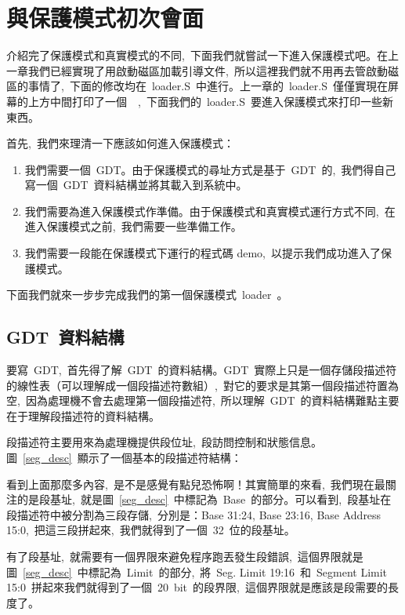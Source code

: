 \section{與保護模式初次會面}

介紹完了保護模式和真實模式的不同,~下面我們就嘗試一下進入保護模式吧。在上一章我們已經實現了用啟動磁區加載引導文件,~所以這裡我們就不用再去管啟動磁區的事情了,~下面的修改均在~loader.S~中進行。上一章的~loader.S~僅僅實現在屏幕的上方中間打印了一個~~,~下面我們的~loader.S~要進入保護模式來打印一些新東西。

首先,~我們來理清一下應該如何進入保護模式：

\begin{enumerate}
  \item 我們需要一個~GDT。由于保護模式的尋址方式是基于~GDT~的,~我們得自己寫一個~GDT~資料結構並將其載入到系統中。
  \item 我們需要為進入保護模式作準備。由于保護模式和真實模式運行方式不同,~在進入保護模式之前,~我們需要一些準備工作。
  \item 我們需要一段能在保護模式下運行的程式碼 demo,~以提示我們成功進入了保護模式。
\end{enumerate}

下面我們就來一步步完成我們的第一個保護模式~loader~。

\subsection{GDT~資料結構}

要寫~GDT,~首先得了解~GDT~的資料結構。GDT~實際上只是一個存儲段描述符的線性表（可以理解成一個段描述符數組）,~對它的要求是其第一個段描述符置為空,~因為處理機不會去處理第一個段描述符,~所以理解~GDT~的資料結構難點主要在于理解段描述符的資料結構。

段描述符主要用來為處理機提供段位址,~段訪問控制和狀態信息。圖~\ref{seg_desc}~顯示了一個基本的段描述符結構：


看到上面那麼多內容,~是不是感覺有點兒恐怖啊！其實簡單的來看,~我們現在最關注的是段基址,~就是圖~\ref{seg_desc}~中標記為~Base~的部分。可以看到,~段基址在段描述符中被分割為三段存儲,~分別是：Base 31:24, Base 23:16, Base Address 15:0,~把這三段拼起來,~我們就得到了一個~32~位的段基址。

有了段基址,~就需要有一個界限來避免程序跑丟發生段錯誤,~這個界限就是圖~\ref{seg_desc}~中標記為~Limit~的部分,~將~Seg. Limit 19:16~和~Segment Limit 15:0~拼起來我們就得到了一個~20~bit~的段界限,~這個界限就是應該是段需要的長度了。

